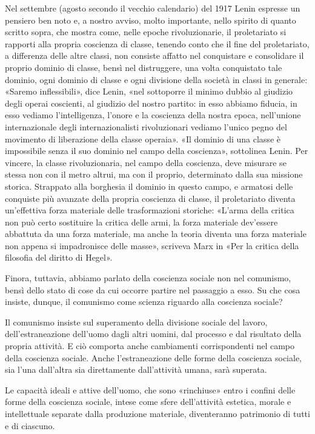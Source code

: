 \documentclass[12pt,a4paper,openany]{book}
\begin{document}
Nel settembre (agosto secondo il vecchio calendario) del 1917 Lenin espresse un pensiero ben noto e, a nostro avviso, molto importante, nello spirito di quanto scritto sopra, che mostra come, nelle epoche rivoluzionarie, il proletariato si rapporti alla propria coscienza di classe, tenendo conto che il fine del proletariato, a differenza delle altre classi, non consiste affatto nel conquistare e consolidare il proprio dominio di classe, bensì nel distruggere, una volta conquistato tale dominio, ogni dominio di classe e ogni divisione della società in classi in generale: «Saremo inflessibili», dice Lenin, «nel sottoporre il minimo dubbio al giudizio degli operai coscienti, al giudizio del nostro partito: in esso abbiamo fiducia, in esso vediamo l'intelligenza, l'onore e la coscienza della nostra epoca, nell'unione internazionale degli internazionalisti rivoluzionari vediamo l'unico pegno del movimento di liberazione della classe operaia». «Il dominio di una classe è impossibile senza il suo dominio nel campo della coscienza», sottolinea Lenin. Per vincere, la classe rivoluzionaria, nel campo della coscienza, deve misurare se stessa non con il metro altrui, ma con il proprio, determinato dalla sua missione storica. Strappato alla borghesia il dominio in questo campo, e armatosi delle conquiste più avanzate della propria coscienza di classe, il proletariato diventa un'effettiva forza materiale delle trasformazioni storiche: «L'arma della critica non può certo sostituire la critica delle armi, la forza materiale dev'essere abbattuta da una forza materiale, ma anche la teoria diventa una forza materiale non appena si impadronisce delle masse», scriveva Marx in «Per la critica della filosofia del diritto di Hegel».

Finora, tuttavia, abbiamo parlato della coscienza sociale non nel comunismo, bensì dello stato di cose da cui occorre partire nel passaggio a esso. Su che cosa insiste, dunque, il comunismo come scienza riguardo alla coscienza sociale?

Il comunismo insiste sul superamento della divisione sociale del lavoro, dell'estraneazione dell'uomo dagli altri uomini, dal processo e dal risultato della propria attività. E ciò comporta anche cambiamenti corrispondenti nel campo della coscienza sociale. Anche l'estraneazione delle forme della coscienza sociale, sia l'una dall'altra sia direttamente dall'attività umana, sarà superata.

Le capacità ideali e attive dell'uomo, che sono «rinchiuse» entro i confini delle forme della coscienza sociale, intese come sfere dell'attività estetica, morale e intellettuale separate dalla produzione materiale, diventeranno patrimonio di tutti e di ciascuno.
\end{document}
